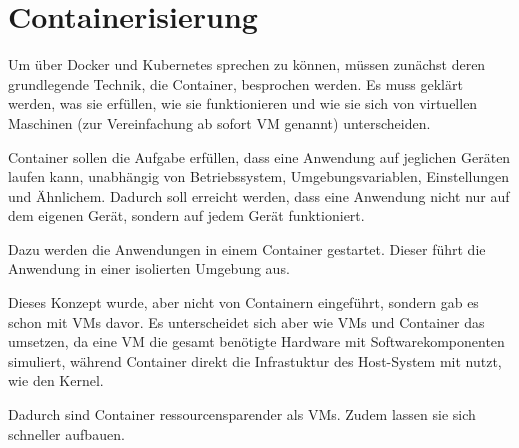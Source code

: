 \section{Containerisierung}

Um über Docker und Kubernetes sprechen zu können, müssen zunächst deren grundlegende Technik, die Container, besprochen werden. 
Es muss geklärt werden, was sie erfüllen, wie sie funktionieren und wie sie sich von virtuellen Maschinen (zur Vereinfachung ab sofort VM genannt) unterscheiden.

Container sollen die Aufgabe erfüllen, dass eine Anwendung auf jeglichen Geräten laufen kann, unabhängig von Betriebssystem, Umgebungsvariablen, Einstellungen und Ähnlichem. 
Dadurch soll erreicht werden, dass eine Anwendung nicht nur auf dem eigenen Gerät, sondern auf jedem Gerät funktioniert.

Dazu werden die Anwendungen in einem Container gestartet. Dieser führt die Anwendung in einer isolierten Umgebung aus. 

Dieses Konzept wurde, aber nicht von Containern eingeführt, sondern gab es schon mit VMs davor. 
Es unterscheidet sich aber wie VMs und Container das umsetzen, da eine VM die gesamt benötigte Hardware mit Softwarekomponenten simuliert,
während Container direkt die Infrastuktur des Host-System mit nutzt, wie den Kernel. \parencite[vgl. 54]{kofler2023docker}

Dadurch sind Container ressourcensparender als VMs. Zudem lassen sie sich schneller aufbauen.